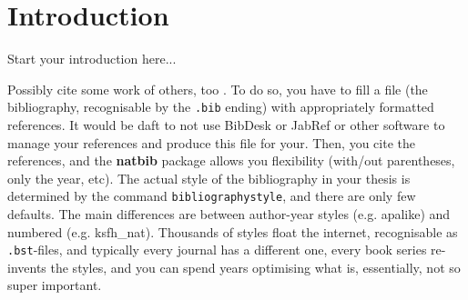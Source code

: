 \chapter{Introduction}
\label{ch:introduction}


Start your introduction here...

Possibly cite some work of others, too \citep{Adiku1995}. To do so, you have to fill a file (the bibliography, recognisable by the \texttt{.bib} ending) with appropriately formatted references. It would be daft to not use BibDesk or JabRef or other software to manage your references and produce this file for your. Then, you cite the references, and the \textbf{natbib} package allows you flexibility (with/out parentheses, only the year, etc). The actual style of the bibliography in your thesis is determined by the command \texttt{bibliographystyle}, and there are only few defaults. The main differences are between author-year styles (e.g. apalike) and numbered (e.g. ksfh\_nat). Thousands of styles float the internet, recognisable as \texttt{.bst}-files, and typically every journal has a different one, every book series re-invents the styles, and you can spend years optimising what is, essentially, not so super important.

